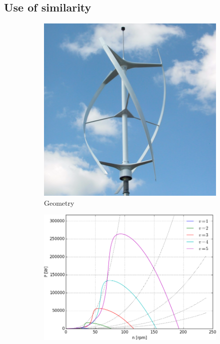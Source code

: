 \subsection{Use of similarity}

\begin{figure}[!h]
  \centering
  \begin{subfigure}{0.24\textwidth}
    \includegraphics[width=\textwidth]{principles/vawt.png}
    \caption{Geometry}
    \label{fig:vawtGeometry}
  \end{subfigure}
  \begin{subfigure}{0.37\textwidth}
    \includegraphics[width=\textwidth]{principles/vawtPower.png}

\end{subfigure}
\end{figure}
